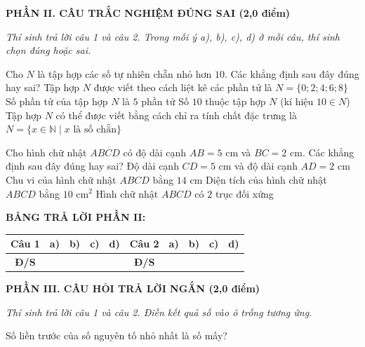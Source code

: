 \documentclass[12pt,a4paper]{article}
\begin{document}
\setcounter{ex}{0}
\noindent\textbf{\large PHẦN II. CÂU TRẮC NGHIỆM ĐÚNG SAI (2,0 điểm)}

\textit{Thí sinh trả lời câu 1 và câu 2. Trong mỗi ý a), b), c), d) ở mỗi câu, thí sinh chọn đúng hoặc sai.}

\vspace{1mm}
\begin{ex}
Cho $N$ là tập hợp các số tự nhiên chẵn nhỏ hơn $10$. Các khẳng định sau đây đúng hay sai?
\choiceTF
{\True Tập hợp $N$ được viết theo cách liệt kê các phần tử là $N = \{0; 2; 4; 6; 8\}$}
{\True Số phần tử của tập hợp $N$ là $5$ phần tử}
{Số $10$ thuộc tập hợp $N$ (kí hiệu $10 \in N$)}
{Tập hợp $N$ có thể được viết bằng cách chỉ ra tính chất đặc trưng là $N = \{x \in \mathbb{N} \mid x \text{ là số chẵn}\}$}
\end{ex}

\begin{ex}
Cho hình chữ nhật $ABCD$ có độ dài cạnh $AB = 5\text{ cm}$ và $BC = 2\text{ cm}$. Các khẳng định sau đây đúng hay sai?
\choiceTF
{\True Độ dài cạnh $CD = 5\text{ cm}$ và độ dài cạnh $AD = 2\text{ cm}$}
{\True Chu vi của hình chữ nhật $ABCD$ bằng $14\text{ cm}$}
{\True Diện tích của hình chữ nhật $ABCD$ bằng $10\text{ cm}^2$}
{\True Hình chữ nhật $ABCD$ có $2$ trục đối xứng}
\end{ex}


\noindent\textbf{BẢNG TRẢ LỜI PHẦN II:}
\begin{center}
\begin{tabular}{|c|c|c|c|c||c|c|c|c|c|}
\hline
\textbf{Câu 1} & \textbf{a)} & \textbf{b)} & \textbf{c)} & \textbf{d)} & \textbf{Câu 2} & \textbf{a)} & \textbf{b)} & \textbf{c)} & \textbf{d)} \\
\hline
\textbf{Đ/S} & \rule{0pt}{0.6cm} & & & & \textbf{Đ/S} & & & & \\
\hline
\end{tabular}
\end{center}
\vspace{2mm}

\setcounter{ex}{0}
\noindent\textbf{\large PHẦN III. CÂU HỎI TRẢ LỜI NGẮN (2,0 điểm)}

\textit{Thí sinh trả lời câu 1 và câu 2. Điền kết quả số vào ô trống tương ứng.}

\vspace{1mm}
\begin{ex}
Số liền trước của số nguyên tố nhỏ nhất là số mấy? 
\end{ex}
\end{document}
